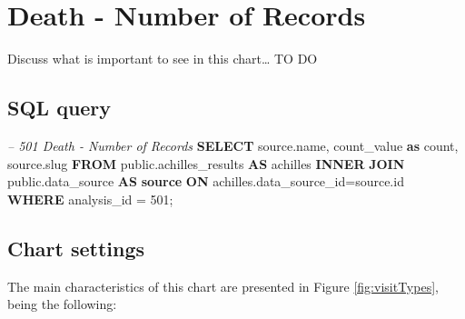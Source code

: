 \documentclass[]{book}
\newenvironment{Shaded}{\begin{snugshade}}{\end{snugshade}}
\newcommand{\KeywordTok}[1]{\textcolor[rgb]{0.13,0.29,0.53}{\textbf{#1}}}
\newcommand{\DecValTok}[1]{\textcolor[rgb]{0.00,0.00,0.81}{#1}}
\newcommand{\CommentTok}[1]{\textcolor[rgb]{0.56,0.35,0.01}{\textit{#1}}}
\newcommand{\FunctionTok}[1]{\textcolor[rgb]{0.00,0.00,0.00}{#1}}
\newcommand{\NormalTok}[1]{#1}
\begin{document}
\section{Death - Number of Records}\label{death---number-of-records}

Discuss what is important to see in this chart\ldots{} TO DO

\subsection{SQL query}\label{sql-query-15}

\begin{Shaded}
\begin{Highlighting}[]
\CommentTok{-- 501  Death - Number of Records}
\KeywordTok{SELECT}\NormalTok{ source.name,}
\NormalTok{       count_value }\KeywordTok{as} \FunctionTok{count}\NormalTok{, }
\NormalTok{       source.slug}
\KeywordTok{FROM}\NormalTok{ public.achilles_results }\KeywordTok{AS}\NormalTok{ achilles }
    \KeywordTok{INNER} \KeywordTok{JOIN}\NormalTok{ public.data_source }\KeywordTok{AS} \KeywordTok{source} \KeywordTok{ON} 
\NormalTok{      achilles.data_source_id=source.id}
\KeywordTok{WHERE}\NormalTok{ analysis_id = }\DecValTok{501}\NormalTok{;}
\end{Highlighting}
\end{Shaded}

\subsection{Chart settings}\label{chart-settings-15}

The main characteristics of this chart are presented in Figure
\ref{fig:visitTypes}, being the following:
\end{document}
